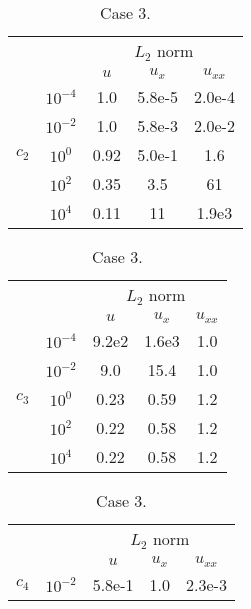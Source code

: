 \documentclass[final,3p]{elsarticle}
\begin{document}
\begin{table}[!ht]
\begin{subtable}{0.5\textwidth}
\centering
\begin{tabular}{|c|c|c|c|c|} \hline   
\multicolumn{2}{|c|}{} &\multicolumn{3}{c|}{$L_2$ norm}  \\	%
\cline{3-5}
\multicolumn{2}{|c|}{}& $u$ & $u_{x}$ & $u_{xx}$ \\	%
\hline
\multirow{5}{*}{$c_2$}
&$10^{-4}$ & {1.0} & {5.8e-5} & {2.0e-4} \\
\cline{2-5}  
&$10^{-2}$ & {1.0} & {5.8e-3} & {2.0e-2} \\
\cline{2-5}  
&$10^{0}$& {0.92} & {5.0e-1} & {1.6} \\
\cline{2-5} 
&$10^{2}$& {0.35} & {3.5} & {61} \\
\cline{2-5} 
&$10^{4}$& {0.11} & {11} & {1.9e3}  \\	%
\hline
\end{tabular}
\caption [sss] {Case 2.}
\label{Table: L2 norm Poisson pexp} 
\end{subtable}
\begin{subtable}{0.5\textwidth}
\centering
\begin{tabular}{|c|c|c|c|c|} \hline   
\multicolumn{2}{|c|}{} &\multicolumn{3}{c|}{$L_2$ norm}  \\	%
\cline{3-5}
\multicolumn{2}{|c|}{}& $u$ & $u_{x}$ & $u_{xx}$ \\	%
\hline
\multirow{5}{*}{$c_3$}
&$10^{-4}$ & {9.2e2} & {1.6e3} & {1.0} \\
\cline{2-5} 
&$10^{-2}$ &  {9.0} & {15.4} & {1.0} \\
\cline{2-5}
&$10^{0}$ & {0.23} & {0.59} & {1.2} \\
\cline{2-5} 
&$10^{2}$& {0.22} & {0.58} & {1.2} \\
\cline{2-5} 
&$10^{4}$& {0.22} & {0.58} & {1.2} \\
\hline
\end{tabular}
\caption [sss] {Case 3.} 
\label{Table: L2 norm Poisson p Lover2pi^2sin -x^2/2} 
\end{subtable}
\begin{subtable}{0.5\textwidth}
\centering
\begin{tabular}{|c|c|c|c|c|} \hline   
\multicolumn{2}{|c|}{} &\multicolumn{3}{c|}{$L_2$ norm} \\	%
\cline{3-5}
\multicolumn{2}{|c|}{}& $u$ & $u_{x}$ & $u_{xx}$ \\	%
\hline
\multirow{5}{*}{$c_4$}
&$10^{-2}$& 5.8e-1 & 1.0 & 2.3e-3 \\

\end{tabular}
\end{subtable}
\end{table}
\end{document}
